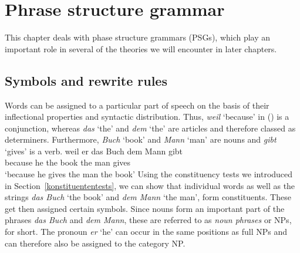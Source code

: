 
\chapter{Phrase structure grammar}
\label{Kapitel-PSG}

This chapter deals with phase structure grammars (PSGs), which play an important role in several of the theories we will encounter in later chapters.

\section{Symbols and rewrite rules}
\label{sec-simple-psg}

Words can be assigned to a particular part of speech on the basis of their inflectional properties
and syntactic distribution. Thus, \emph{weil} `because' in ()
is a conjunction, whereas \emph{das} `the' and \emph{dem} `the' are
articles and therefore classed as determiners. Furthermore, \emph{Buch} `book' and \emph{Mann} `man' are nouns 
and \emph{gibt} `gives' is a verb.
\ea\label{bsp-weil-er-das-buch-dem-mann-gibt}
\gll weil er das Buch dem Mann gibt\\
	 because he the book the man gives\\
\glt `because he gives the man the book'
\z
Using the constituency tests we introduced in Section~\ref{konstituententests}, we can show that
individual words as well as the strings \emph{das Buch} `the book' and \emph{dem Mann} `the man',
form constituents. These get then assigned certain symbols. Since nouns form an important part of
the phrases \emph{das Buch} and \emph{dem Mann}, these are referred to as \emph{noun phrases} or
NPs, for short. The pronoun \emph{er} `he' can occur in the same positions as full NPs and can
therefore also be assigned to the category NP.

